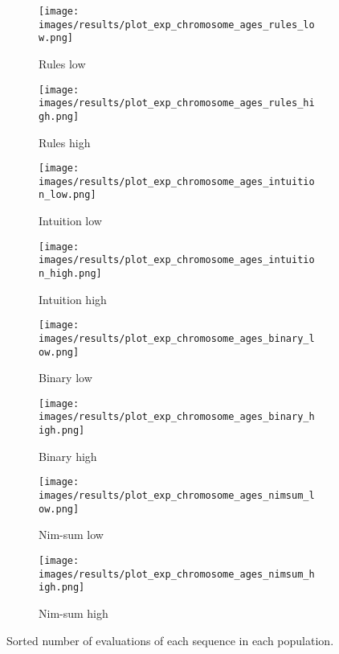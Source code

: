 \begin{landscape}
\begin{figure}[p]
	\begin{subfigure}{0.24\linewidth}
	\centering
	\texttt{[image: images/results/plot\_exp\_chromosome\_ages\_rules\_low.png]}
	\caption{Rules low}
	\label{fig:exp_age_rules_low}
	\end{subfigure}
	\hfill
	\begin{subfigure}{0.24\linewidth}
	\centering
	\texttt{[image: images/results/plot\_exp\_chromosome\_ages\_rules\_high.png]}
	\caption{Rules high}
	\label{fig:exp_age_rules_high}
	\end{subfigure}
	\begin{subfigure}{0.24\linewidth}
	\centering
	\texttt{[image: images/results/plot\_exp\_chromosome\_ages\_intuition\_low.png]}
	\caption{Intuition low}
	\label{fig:exp_age_intuition_low}
	\end{subfigure}
	\hfill
	\begin{subfigure}{0.24\linewidth}
	\centering
	\texttt{[image: images/results/plot\_exp\_chromosome\_ages\_intuition\_high.png]}
	\caption{Intuition high}
	\label{fig:exp_age_intuition_high}
	\end{subfigure}
	\begin{subfigure}{0.24\linewidth}
	\centering
	\texttt{[image: images/results/plot\_exp\_chromosome\_ages\_binary\_low.png]}
	\caption{Binary low}
	\label{fig:exp_age_binary_low}
	\end{subfigure}
	\hfill
	\begin{subfigure}{0.24\linewidth}
	\centering
	\texttt{[image: images/results/plot\_exp\_chromosome\_ages\_binary\_high.png]}
	\caption{Binary high}
	\label{fig:exp_age_binary_high}
	\end{subfigure}
	\begin{subfigure}{0.24\linewidth}
	\centering
	\texttt{[image: images/results/plot\_exp\_chromosome\_ages\_nimsum\_low.png]}
	\caption{Nim-sum low}
	\label{fig:exp_age_nimsum_low}
	\end{subfigure}
	\hfill
	\begin{subfigure}{0.24\linewidth}
	\centering
	\texttt{[image: images/results/plot\_exp\_chromosome\_ages\_nimsum\_high.png]}
	\caption{Nim-sum high}
	\label{fig:exp_age_nimsum_high}
	\end{subfigure}
	\caption[Sorted number of evaluations]{Sorted number of evaluations of each
	sequence in each population.}
	\label{fig:exp_ages1}
\end{figure}
\end{landscape}

